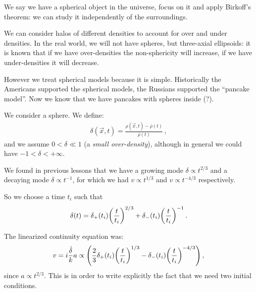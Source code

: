 \documentclass[main.tex]{subfiles}
\begin{document}





We say we have a spherical object in the universe, focus on it and apply Birkoff's theorem: we can study it independently of the surroundings. 

We can consider halos of different densities to account for over and under densities. 
In the real world, we will not have spheres, but three-axial ellipsoids: it is known that if we have over-densities the non-sphericity will increase, if we have under-densities it will decrease. 

However we treat spherical models because it is simple.
Historically the Americans supported the spherical models, the Russians supported the ``pancake model''. 
Now we know that we have pancakes with spheres inside (?). 

We consider a sphere. We define: 
%
\begin{align}
\delta (\vec{x}, t) = \frac{\rho (\vec{x}, t) - \overline{\rho}(t)}{\overline{\rho}(t)} 
\,,
\end{align}
%
and we assume \(0<\delta \ll 1\) (a \emph{small over-density}), although in general we could have \(-1 < \delta < + \infty \). 

We found in previous lessons that we have a growing mode \(\delta \propto t^{2/3}\) and a decaying mode \(\delta \propto t^{-1}\), for which we had \(v \propto t^{1/3} \) and \(v \propto t^{-4/3}\) respectively. 

So we choose a time \(t_i\) such that 
%
\begin{align}
\delta (t) = \delta_+ (t_i) \qty(\frac{t}{t_i})^{2/3}
+ \delta_- (t_i) \qty(\frac{t}{t_i})^{-1}
\,.
\end{align}

The linearized continuity equation was: 
%
\begin{align}
v = i \frac{ \dot{\delta}}{k} a 
\propto \qty(\frac{2}{3} \delta_{+} (t_i) \qty(\frac{t}{t_i})^{1/3} - \delta_{-} (t_i) \qty(\frac{t}{t_i})^{-4/3})
\,,
\end{align}
%
since \(a \propto t^{2/3}\). This is in order to write explicitly the fact that we need two initial conditions. 
\end{document}

